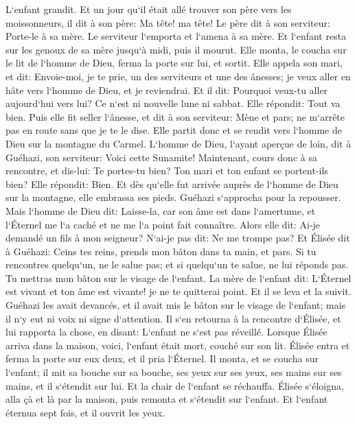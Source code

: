 \verse L`enfant grandit. Et un jour qu`il était allé trouver son père vers les moissonneurs, 
\verse il dit à son père: Ma tête! ma tête! Le père dit à son serviteur: Porte-le à sa mère. 
\verse Le serviteur l`emporta et l`amena à sa mère. Et l`enfant resta sur les genoux de sa mère jusqu`à midi, puis il mourut. 
\verse Elle monta, le coucha sur le lit de l`homme de Dieu, ferma la porte sur lui, et sortit. 
\verse Elle appela son mari, et dit: Envoie-moi, je te prie, un des serviteurs et une des ânesses; je veux aller en hâte vers l`homme de Dieu, et je reviendrai. 
\verse Et il dit: Pourquoi veux-tu aller aujourd`hui vers lui? Ce n`est ni nouvelle lune ni sabbat. Elle répondit: Tout va bien. 
\verse Puis elle fit seller l`ânesse, et dit à son serviteur: Mène et pars; ne m`arrête pas en route sans que je te le dise. 
\verse Elle partit donc et se rendit vers l`homme de Dieu sur la montagne du Carmel. L`homme de Dieu, l`ayant aperçue de loin, dit à Guéhazi, son serviteur: Voici cette Sunamite! 
\verse Maintenant, cours donc à sa rencontre, et dis-lui: Te portes-tu bien? Ton mari et ton enfant se portent-ils bien? Elle répondit: Bien. 
\verse Et dès qu`elle fut arrivée auprès de l`homme de Dieu sur la montagne, elle embrassa ses pieds. Guéhazi s`approcha pour la repousser. Mais l`homme de Dieu dit: Laisse-la, car son âme est dans l`amertume, et l`Éternel me l`a caché et ne me l`a point fait connaître. 
\verse Alors elle dit: Ai-je demandé un fils à mon seigneur? N`ai-je pas dit: Ne me trompe pas? 
\verse Et Élisée dit à Guéhazi: Ceins tes reins, prends mon bâton dans ta main, et pars. Si tu rencontres quelqu`un, ne le salue pas; et si quelqu`un te salue, ne lui réponds pas. Tu mettras mon bâton sur le visage de l`enfant. 
\verse La mère de l`enfant dit: L`Éternel est vivant et ton âme est vivante! je ne te quitterai point. Et il se leva et la suivit. 
\verse Guéhazi les avait devancés, et il avait mis le bâton sur le visage de l`enfant; mais il n`y eut ni voix ni signe d`attention. Il s`en retourna à la rencontre d`Élisée, et lui rapporta la chose, en disant: L`enfant ne s`est pas réveillé. 
\verse Lorsque Élisée arriva dans la maison, voici, l`enfant était mort, couché sur son lit. 
\verse Élisée entra et ferma la porte sur eux deux, et il pria l`Éternel. 
\verse Il monta, et se coucha sur l`enfant; il mit sa bouche sur sa bouche, ses yeux sur ses yeux, ses mains sur ses mains, et il s`étendit sur lui. Et la chair de l`enfant se réchauffa. 
\verse Élisée s`éloigna, alla çà et là par la maison, puis remonta et s`étendit sur l`enfant. Et l`enfant éternua sept fois, et il ouvrit les yeux. 
